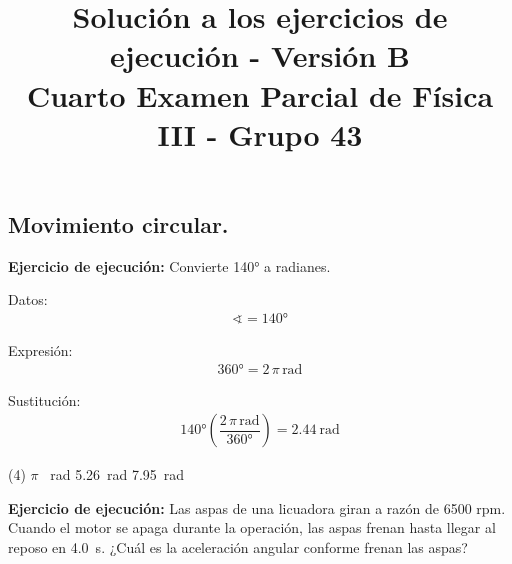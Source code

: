 \documentclass[12pt, letter]{exam}
\date{}
\title{Solución a los ejercicios de ejecución - Versión B \\ Cuarto Examen Parcial de Física III - Grupo 43}
\begin{document}
\maketitle

\setcounter{page}{2}

\begin{questions}
    \section{Movimiento circular.}

    \setcounter{question}{4} \question \textbf{Ejercicio de ejecución: } Convierte \ang{140} a radianes.

    \begin{minipage}[t]{0.35\linewidth}
    Datos: 
    \begin{align*}
    \sphericalangle = \ang{140}
    \end{align*}
    \end{minipage}
    \hspace{1cm}
    \begin{minipage}[t]{0.4\linewidth}
    Expresión:
    \begin{align*}
    \ang{360} = 2 \, \pi \, \unit{\radian}
    \end{align*}
    \end{minipage}

    Sustitución:
    \begin{align*}
    \ang{140} \left( \dfrac{2 \, \pi \, \unit{\radian}}{\ang{360}} \right) = \SI{2.44}{\radian}
    \end{align*}

    \vspace{0.3cm}
    \begin{tasks}(4)
        \task $\pi$ \, \unit{\radian}
        \task {}
        \task \SI{5.26}{\radian}
        \task \SI{7.95}{\radian}
    \end{tasks}

    \question \label{Ejercicio_02} \textbf{Ejercicio de ejecución: } Las aspas de una licuadora giran a razón de \num{6500} rpm. Cuando el motor se apaga durante la operación, las aspas frenan hasta llegar al reposo en \SI{4.0}{\second}. ¿Cuál es la aceleración angular conforme frenan las aspas?
    

\end{questions}
\end{document}
